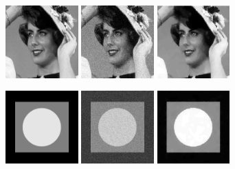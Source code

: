 \documentclass[notheorems,mathserif,table,compress]{beamer}  %
\begin{document}
%
\begin{frame}

\end{frame}

%
\begin{frame}

\end{frame}

%
\begin{frame}

\end{frame}

%
\begin{frame}
\begin{figure}[!ht]
\begin{minipage}[t]{0.5\textwidth}
\centering
\includegraphics[width=1.1in]{imgs/Lena.png}
\includegraphics[width=1.1in]{imgs/Lenanoise.png}
\includegraphics[width=1.1in]{imgs/Lenadenoise2.png}
\end{minipage}
\begin{minipage}[t]{0.5\textwidth}
\centering
\includegraphics[width=1.1in]{imgs/gaussian-original.png}
\includegraphics[width=1.1in]{imgs/gaussian-noise.png}
\includegraphics[width=1.1in]{imgs/gaussian-denoise2.png}
\end{minipage}
\end{figure} 
\end{frame}
\end{document}
